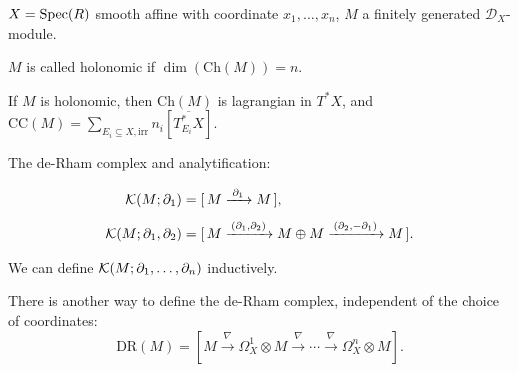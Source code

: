 

$X = \operatorname{Spec}(R)$ smooth affine with coordinate $x_1,\ldots,x_n$, $M$ a finitely generated $\mathcal{D}_X$-module.
\begin{defn}
  $M$ is called holonomic if $\dim(\mathrm{Ch}(M)) = n$.
\end{defn}

\begin{cor}
  If $M$ is holonomic, then $\mathrm{Ch}(M)$ is lagrangian in $T^*X$, and $\mathrm{CC}(M) = \sum_{E_i \subseteq X,  \textrm{irr}} n_i [\overline{T^*_{E_i}X}]$.
\end{cor}

The de-Rham complex and  analytification:

\begin{align*}
  \mathcal{K}(M;\partial_1)
  &= [\, M \xrightarrow{\;\partial_1\;} M \,], \\[4pt]
  \mathcal{K}(M;\partial_1,\partial_2)
  &= [\,
      M
      \xrightarrow{\,(\partial_1,\partial_2)\,}
      M \oplus M
      \xrightarrow{\,(\partial_2,-\partial_1)\,}
      M
     \,].
\end{align*}

We can define $\mathcal{K}(M;\partial_1,\ldots,\partial_n)$ inductively.

There is another way to define the de-Rham complex, independent of the choice of coordinates:
\[\mathrm{DR}(M) = [M \xrightarrow{\;\nabla\;} \Omega^1_X \otimes M \xrightarrow{\;\nabla\;} \cdots \xrightarrow{\;\nabla\;} \Omega^n_X \otimes M].\]



